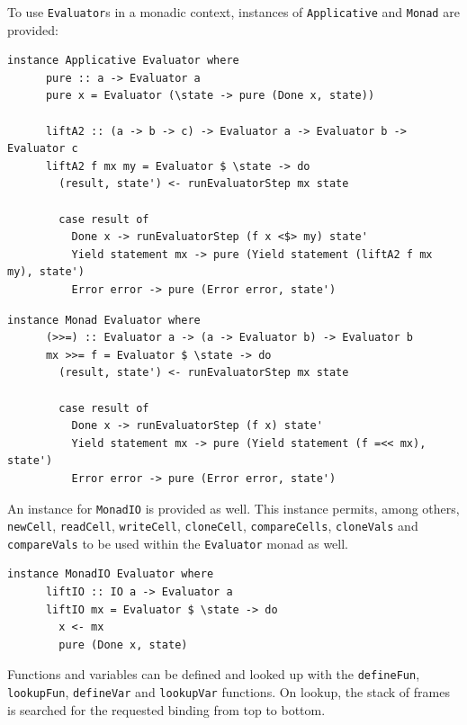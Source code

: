 \documentclass[UdineBachThesis,american,11pt]{PhdThesis}
\begin{document}
  To use \mbox{\texttt{Evaluator}s} in a monadic context, instances of
  \mbox{\texttt{Applicative}} and \mbox{\texttt{Monad}} are provided:

  \begin{Verbatim}[gobble=4,fontsize=\small]
    instance Applicative Evaluator where
      pure :: a -> Evaluator a
      pure x = Evaluator (\state -> pure (Done x, state))

      liftA2 :: (a -> b -> c) -> Evaluator a -> Evaluator b -> Evaluator c
      liftA2 f mx my = Evaluator $ \state -> do
        (result, state') <- runEvaluatorStep mx state

        case result of
          Done x -> runEvaluatorStep (f x <$> my) state'
          Yield statement mx -> pure (Yield statement (liftA2 f mx my), state')
          Error error -> pure (Error error, state')
  \end{Verbatim}

  \pagebreak

  \begin{Verbatim}[gobble=4,fontsize=\small]
    instance Monad Evaluator where
      (>>=) :: Evaluator a -> (a -> Evaluator b) -> Evaluator b
      mx >>= f = Evaluator $ \state -> do
        (result, state') <- runEvaluatorStep mx state

        case result of
          Done x -> runEvaluatorStep (f x) state'
          Yield statement mx -> pure (Yield statement (f =<< mx), state')
          Error error -> pure (Error error, state')
  \end{Verbatim}

  An instance for \mbox{\texttt{MonadIO}} is provided as well. This instance
  permits, among others, \mbox{\texttt{newCell}}, \mbox{\texttt{readCell}},
  \mbox{\texttt{writeCell}}, \mbox{\texttt{cloneCell}},
  \mbox{\texttt{compareCells}}, \mbox{\texttt{cloneVals}} and
  \mbox{\texttt{compareVals}} to be used within the \mbox{\texttt{Evaluator}}
  monad as well.

  \begin{Verbatim}[gobble=4,fontsize=\small]
    instance MonadIO Evaluator where
      liftIO :: IO a -> Evaluator a
      liftIO mx = Evaluator $ \state -> do
        x <- mx
        pure (Done x, state)
  \end{Verbatim}

  Functions and variables can be defined and looked up with the
  \mbox{\texttt{defineFun}}, \mbox{\texttt{lookupFun}},
  \mbox{\texttt{defineVar}} and \mbox{\texttt{lookupVar}} functions. On lookup,
  the stack of frames is searched for the requested binding from top to bottom.
\end{document}
